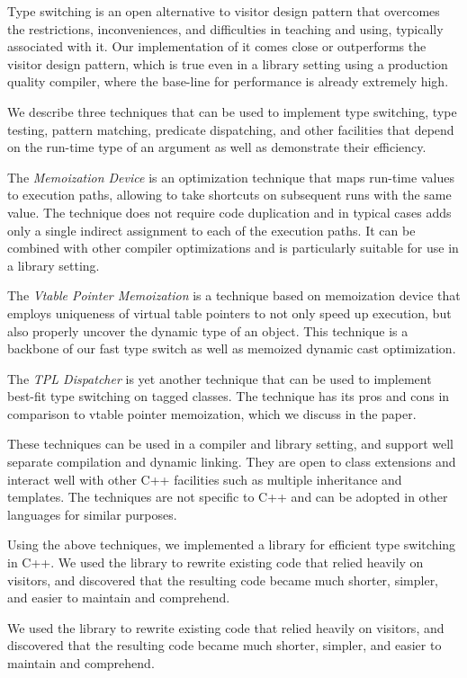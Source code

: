 \documentclass[preprint]{sigplanconf}
\begin{document}
Type switching is an open alternative to visitor design pattern that overcomes 
the restrictions, inconveniences, and difficulties in teaching and using, 
typically associated with it. Our implementation of it comes close or 
outperforms the visitor design pattern, which is true even in a library setting 
using a production quality compiler, where the base-line for performance is 
already extremely high.

We describe three techniques that can be used to implement type switching, type 
testing, pattern matching, predicate dispatching, and other facilities that 
depend on the run-time type of an argument as well as demonstrate their efficiency.

The \emph{Memoization Device} is an optimization technique that maps run-time values 
to execution paths, allowing to take shortcuts on subsequent runs with the same 
value. The technique does not require code duplication and in typical cases adds 
only a single indirect assignment to each of the execution paths. It can be 
combined with other compiler optimizations and is particularly suitable for use 
in a library setting.

The \emph{Vtable Pointer Memoization} is a technique based on memoization device that 
employs uniqueness of virtual table pointers to not only speed up execution, but 
also properly uncover the dynamic type of an object. This technique is a 
backbone of our fast type switch as well as memoized dynamic cast optimization.

The \emph{TPL Dispatcher} is yet another technique that can be used to 
implement best-fit type switching on tagged classes. The technique has its pros 
and cons in comparison to vtable pointer memoization, which we discuss in the paper.

These techniques can be used in a compiler and library setting, and support well 
separate compilation and dynamic linking. They are open to class extensions and 
interact well with other C++ facilities such as multiple inheritance and 
templates. The techniques are not specific to C++ and can be adopted in other 
languages for similar purposes.

Using the above techniques, we implemented a library for efficient type switching 
in C++. We used the library to rewrite existing code that relied heavily on 
visitors, and discovered that the resulting code became much shorter, simpler, 
and easier to maintain and comprehend.

We used the library to rewrite existing code that relied heavily on 
visitors, and discovered that the resulting code became much shorter, simpler, and easier 
to maintain and comprehend.



\end{document}
